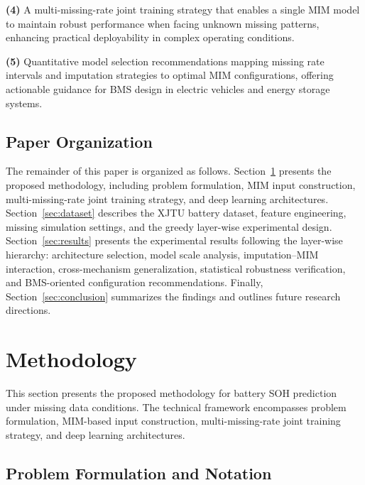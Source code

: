 \documentclass[5p,times]{elsarticle}
\begin{document}
\textbf{(4)} A multi-missing-rate joint training strategy that enables a single MIM model to maintain robust performance when facing unknown missing patterns, enhancing practical deployability in complex operating conditions.

\textbf{(5)} Quantitative model selection recommendations mapping missing rate intervals and imputation strategies to optimal MIM configurations, offering actionable guidance for BMS design in electric vehicles and energy storage systems.

\subsection{Paper Organization}\label{sec:organization}

The remainder of this paper is organized as follows. Section~\ref{sec:method} presents the proposed methodology, including problem formulation, MIM input construction, multi-missing-rate joint training strategy, and deep learning architectures. Section~\ref{sec:dataset} describes the XJTU battery dataset, feature engineering, missing simulation settings, and the greedy layer-wise experimental design. Section~\ref{sec:results} presents the experimental results following the layer-wise hierarchy: architecture selection, model scale analysis, imputation--MIM interaction, cross-mechanism generalization, statistical robustness verification, and BMS-oriented configuration recommendations. Finally, Section~\ref{sec:conclusion} summarizes the findings and outlines future research directions.

\section{Methodology}\label{sec:method}

This section presents the proposed methodology for battery SOH prediction under missing data conditions. The technical framework encompasses problem formulation, MIM-based input construction, multi-missing-rate joint training strategy, and deep learning architectures.

\subsection{Problem Formulation and Notation}\label{sec:formulation}
\end{document}
